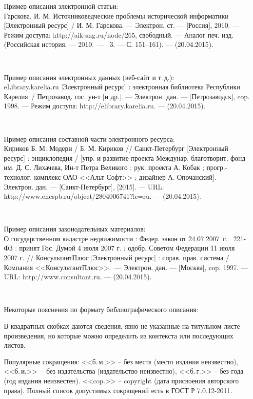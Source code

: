 \documentclass[utf8,12pt, coursreport]{G7-32}
\begin{document}
Пример описания электронной статьи:\\
Гарскова, И. М. Источниковедческие проблемы исторической информатики [Электронный ресурс] / И. М. Гарскова. --- Электрон. ст. --- [Россия], 2010. --- Режим доступа: http://aik-sng.ru/node/265, свободный. --- Аналог печ. изд. (Российская история. --- 2010.~--- \No~3. --- С. 151--161). --- (20.04.2015). 

~

Пример описания электронных данных (веб-сайт и т.\,д.):\\
eLibrary.karelia.ru [Электронный ресурс] : электронная библиотека Республики 
Карелия~/ Петрозавод. гос. ун-т [и др.]. --- Электрон. дан. --- [Петрозаводск], cop. 1998. --- Режим дос\-тупа: http://elibrary.karelia.ru. --- (20.04.2015). 

~

Пример описания составной части электронного ресурса:\\
Кириков Б. М. Модерн / Б. М. Кириков // Санкт-Петербург [Электронный ресурс] : энциклопедия / [упр. и развитие проекта Междунар. благотворит. фонд им. Д. С. Лихачева, Ин-т Петра Великого ; рук. проекта А. Кобак ; прогр.-технолог. комплекс ОАО 
<<Альт-Софт>> ; дизайнер А. Опочанский]. --- Электрон. дан. --- [Санкт-Петербург], [2015]. --- URL: http://www.encspb.ru/object/2804006741?lc=ru. --- (20.04.2015).

~

Пример описания законодательных материалов:\\
О государственном кадастре недвижимости : Федер. закон от 24.07.2007~г. \No~221-ФЗ : принят Гос. Думой 4 июля 2007 г. : одобр. Советом Федерации 11 июля 2007 г. // КонсультантПлюс [Электронный ресурс] : справ. прав. система / Компания <<КонсультантПлюс>>.~--- Электрон.  дан. --- [Москва],  cop. 1997. --- URL: http://www.consultant.ru. --- (20.04.2015). 

~

Некоторые пояснения по формату библиографического описания:

В квадратных скобках даются сведения, явно не указанные на титульном листе произведения, но которые можно определить из контекста или последующих листов. 

Популярные сокращения: <<б.\,м.>> -- без места (место издания неизвестно), <<б.\,и.>>~-- без издательства (издательство неизвестно), <<б.\,г.>> -- без года (год издания неизвестен). <<cop.>> -- copyright (дата присвоения авторского права). Полный список допустимых сокращений есть в ГОСТ Р 7.0.12-2011.
\end{document}
